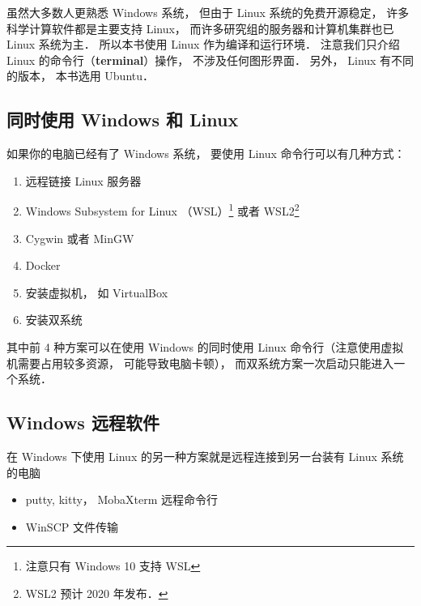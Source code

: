 
虽然大多数人更熟悉 Windows 系统， 但由于 Linux 系统的免费开源稳定， 许多科学计算软件都是主要支持 Linux， 而许多研究组的服务器和计算机集群也已 Linux 系统为主． 所以本书使用 Linux 作为编译和运行环境． 注意我们只介绍 Linux 的命令行（\textbf{terminal}）操作， 不涉及任何图形界面． 另外， Linux 有不同的版本， 本书选用 Ubuntu．

\subsection{同时使用 Windows 和 Linux}
如果你的电脑已经有了 Windows 系统， 要使用 Linux 命令行可以有几种方式：
\begin{enumerate}
\item 远程链接 Linux 服务器
\item Windows Subsystem for Linux （WSL）\footnote{注意只有 Windows 10 支持 WSL} 或者 WSL2\footnote{WSL2 预计 2020 年发布．}
\item Cygwin 或者 MinGW
\item Docker
\item 安装虚拟机， 如 VirtualBox
\item 安装双系统
\end{enumerate}
其中前 4 种方案可以在使用 Windows 的同时使用 Linux 命令行（注意使用虚拟机需要占用较多资源， 可能导致电脑卡顿）， 而双系统方案一次启动只能进入一个系统．

\subsection{Windows 远程软件}
在 Windows 下使用 Linux 的另一种方案就是远程连接到另一台装有 Linux 系统的电脑
\begin{itemize}
\item putty, kitty， MobaXterm 远程命令行
\item WinSCP 文件传输
\end{itemize}

